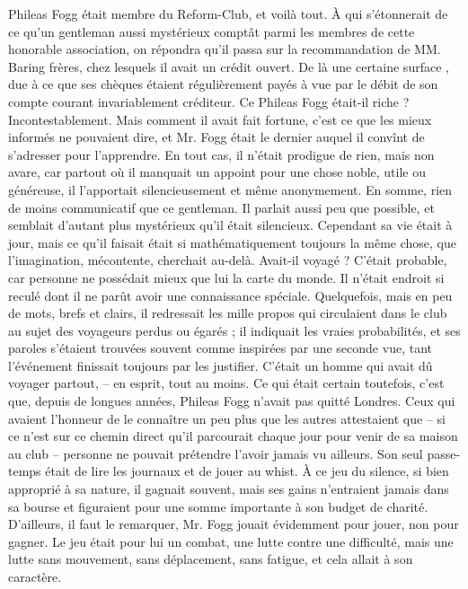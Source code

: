 \documentclass[12pt,a4paper,openany]{book}
\begin{document}
                Phileas Fogg était membre du Reform-Club, et voilà tout.
                À qui s’étonnerait de ce qu’un gentleman aussi mystérieux comptât parmi les membres de cette honorable association, on répondra qu’il passa sur la recommandation de MM. Baring frères, chez lesquels il avait un crédit ouvert. De là une certaine \og surface \fg, due à ce que ses chèques étaient régulièrement payés à vue par le débit de son compte courant invariablement créditeur.
                Ce Phileas Fogg était-il riche ? Incontestablement. Mais comment il avait fait fortune, c’est ce que les mieux informés ne pouvaient dire, et Mr. Fogg était le dernier auquel il convînt de s’adresser pour l’apprendre. En tout cas, il n’était prodigue de rien, mais non avare, car partout où il manquait un appoint pour une chose noble, utile ou généreuse, il l’apportait silencieusement et même anonymement.
                En somme, rien de moins communicatif que ce gentleman. Il parlait aussi peu que possible, et semblait d’autant plus mystérieux qu’il était silencieux. Cependant sa vie était à jour, mais ce qu’il faisait était si mathématiquement toujours la même chose, que l’imagination, mécontente, cherchait au-delà.
                Avait-il voyagé ? C’était probable, car personne ne possédait mieux que lui la carte du monde. Il n’était endroit si reculé dont il ne parût avoir une connaissance spéciale. Quelquefois, mais en peu de mots, brefs et clairs, il redressait les mille propos qui circulaient dans le club au sujet des voyageurs perdus ou égarés ; il indiquait les vraies probabilités, et ses paroles s’étaient trouvées souvent comme inspirées par une seconde vue, tant l’événement finissait toujours par les justifier. C’était un homme qui avait dû voyager partout, – en esprit, tout au moins.
                Ce qui était certain toutefois, c’est que, depuis de longues années, Phileas Fogg n’avait pas quitté Londres. Ceux qui avaient l’honneur de le connaître un peu plus que les autres attestaient que – si ce n’est sur ce chemin direct qu’il parcourait chaque jour pour venir de sa maison au club – personne ne pouvait prétendre l’avoir jamais vu ailleurs. Son seul passe-temps était de lire les journaux et de jouer au whist. À ce jeu du silence, si bien approprié à sa nature, il gagnait souvent, mais ses gains n’entraient jamais dans sa bourse et figuraient pour une somme importante à son budget de charité. D’ailleurs, il faut le remarquer, Mr. Fogg jouait évidemment pour jouer, non pour gagner. Le jeu était pour lui un combat, une lutte contre une difficulté, mais une lutte sans mouvement, sans déplacement, sans fatigue, et cela allait à son caractère.
\end{document}
